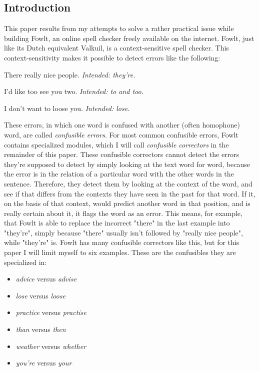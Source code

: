 \documentclass[12pt]{article}
\begin{document}

\subsection{Introduction}

This paper results from my attempts to solve a rather practical issue while building Fowlt, an online spell checker freely available on the internet. Fowlt, just like its Dutch equivalent Valkuil, is a context-sensitive spell checker. This context-sensitivity makes it possible to detect errors like the following:

\begin{examples}

\item There really nice people. \emph{Intended: they're.}
\item I'd like too see you two. \emph{Intended: to and too.}
\item I don't want to loose you. \emph{Intended: lose.}

\end{examples}

These errors, in which one word is confused with another (often homophone) word, are called \emph{confusible errors}. For most common confusible errors, Fowlt contains specialized modules, which I will call \emph{confusible correctors} in the remainder of this paper. These confusible correctors cannot detect the errors they're supposed to detect by simply looking at the text word for word, because the error is in the relation of a particular word with the other words in the sentence. Therefore, they detect them by looking at the context of the word, and see if that differs from the contexts they have seen in the past for that word. If it, on the basis of that context, would predict another word in that position, and is really certain about it, it flags the word as an error. This means, for example, that Fowlt is able to replace the incorrect "there" in the last example into "they're", simply because "there" usually isn't followed by "really nice people", while "they're" is. Fowlt has many confusible correctors like this, but for this paper I will limit myself to six examples. These are the confusibles they are specialized in: 

\begin{itemize}
\item \emph{advice} versus \emph{advise}
\item \emph{lose} versus \emph{loose}
\item \emph{practice} versus \emph{practise}
\item \emph{than} versus \emph{then}
\item \emph{weather} versus \emph{whether}
\item \emph{you're} versus \emph{your}
\end{itemize}
\end{document}
